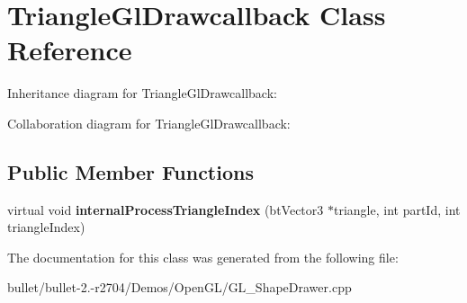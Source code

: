 \hypertarget{class_triangle_gl_drawcallback}{\section{Triangle\+Gl\+Drawcallback Class Reference}
\label{class_triangle_gl_drawcallback}
}


Inheritance diagram for Triangle\+Gl\+Drawcallback\+:


Collaboration diagram for Triangle\+Gl\+Drawcallback\+:
\subsection*{Public Member Functions}
\begin{DoxyCompactItemize}
\item 
\hypertarget{class_triangle_gl_drawcallback_ae0d7897bee9012f8d6491e0e336295bf}{virtual void {\bfseries internal\+Process\+Triangle\+Index} (bt\+Vector3 $\ast$triangle, int part\+Id, int triangle\+Index)}\label{class_triangle_gl_drawcallback_ae0d7897bee9012f8d6491e0e336295bf}

\end{DoxyCompactItemize}


The documentation for this class was generated from the following file\+:\begin{DoxyCompactItemize}
\item 
bullet/bullet-\/2.-\/r2704/\+Demos/\+Open\+G\+L/G\+L\+\_\+\+Shape\+Drawer.\+cpp\end{DoxyCompactItemize}

